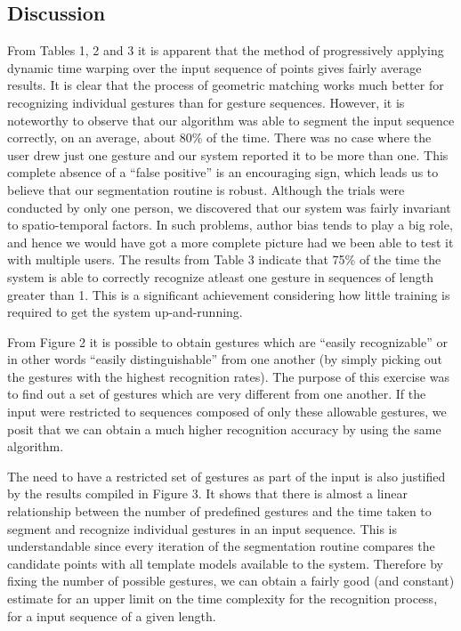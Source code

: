 \documentclass[twoside]{article}
\begin{document}
\begin{multicols}{2}
\section{Discussion}

From Tables 1, 2 and 3 it is apparent that the method of progressively applying
dynamic time warping over the input sequence of points gives fairly average
results. It is clear that the process of geometric matching works much better
for recognizing individual gestures than for gesture sequences. However, it is
noteworthy to observe that our algorithm was able to segment the input sequence
correctly, on an average, about 80\% of the time. There was no case where the
user drew just one gesture and our system reported it to be more than one. This
complete absence of a ``false positive'' is an encouraging sign, which leads us
to believe that our segmentation routine is robust. Although the trials were
conducted by only one person, we discovered that our system was fairly invariant
to spatio-temporal factors. In such problems, author bias tends to play a big
role, and hence we would have got a more complete picture had we been able to
test it with multiple users. The results from Table 3 indicate that 75\% of the
time the system is able to correctly recognize atleast one gesture in sequences
of length greater than 1. This is a significant achievement considering how
little training is required to get the system up-and-running.

From Figure 2 it is possible to obtain gestures which are ``easily
recognizable'' or in other words ``easily distinguishable'' from one another (by
simply picking out the gestures with the highest recognition rates).
The purpose of this exercise was to find out a set of gestures which are very
different from one another. If the input were restricted to sequences composed
of only these allowable gestures, we posit that we can obtain a much higher
recognition accuracy by using the same algorithm.

The need to have a restricted set of gestures as part of the input is also
justified by the results compiled in Figure 3. It shows that there is almost a
linear relationship between the number of predefined gestures and the time taken
to segment and recognize individual gestures in an input sequence. This is
understandable since every iteration of the segmentation routine compares the
candidate points with all template models available to the system. Therefore by
fixing the number of possible gestures, we can obtain a fairly good (and
constant) estimate for an upper limit on the time complexity for the recognition
process, for a input sequence of a given length.


\end{multicols}
\end{document}
